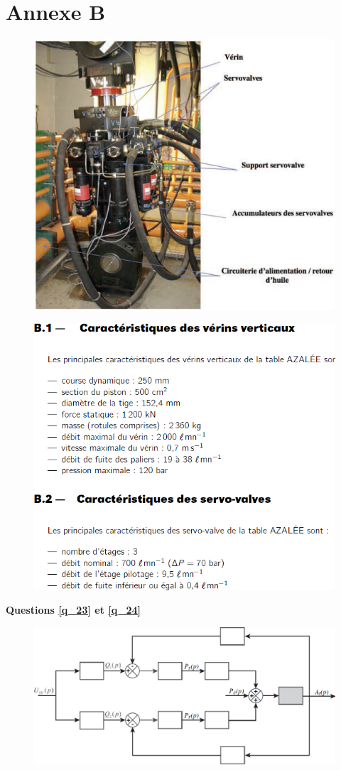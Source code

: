 \documentclass[10pt,fleqn]{article} %
\begin{document}
\section{Annexe B}
\begin{figure}[H]
\centering
\includegraphics[width=.8\linewidth]{ann_b_01}
\end{figure}
\begin{figure}[H]
\centering
\includegraphics[width=.8\linewidth]{ann_b_02}
\end{figure}
\newpage





\textbf{Questions \ref{q_23} et \ref{q_24}}

\begin{figure}[H]
\centering
\includegraphics[width=.8\linewidth]{q_23}
\end{figure}
\end{document}
